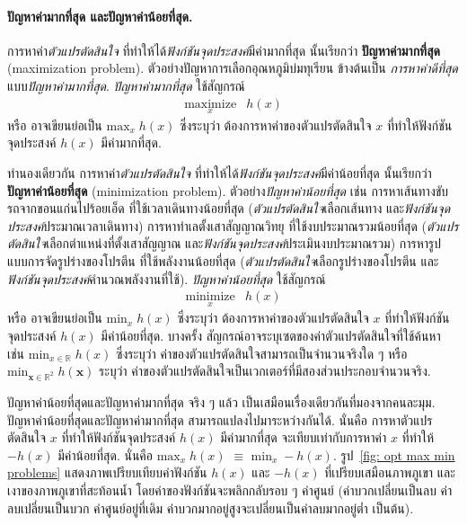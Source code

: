 \paragraph{ปัญหาค่ามากที่สุด และปัญหาค่าน้อยที่สุด.}
การหาค่า\textit{ตัวแปรตัดสินใจ} ที่ทำให้ได้\textit{ฟังก์ชันจุดประสงค์}มีค่ามากที่สุด นั้นเรียกว่า \textbf{ปัญหาค่ามากที่สุด} (maximization problem).
ตัวอย่างปัญหาการเลือกอุณหภูมิบ่มทุเรียน
ข้างต้นเป็น \textit{การหาค่าดีที่สุด}แบบ\textit{ปัญหาค่ามากที่สุด}.
\textit{ปัญหาค่ามากที่สุด} ใช้สัญกรณ์ \begin{eqnarray}
\underset{x}{\mathrm{maximize}} & h(x)
\label{eq: opt max prob}
\end{eqnarray}
หรือ อาจเขียนย่อเป็น $\mathrm{max}_x \; h(x)$
ซึ่งระบุว่า ต้องการหาค่าของตัวแปรตัดสินใจ $x$ ที่ทำให้ฟังก์ชันจุดประสงค์ $h(x)$ มีค่ามากที่สุด.

ทำนองเดียวกัน 
การหาค่า\textit{ตัวแปรตัดสินใจ} ที่ทำให้ได้\textit{ฟังก์ชันจุดประสงค์}มีค่าน้อยที่สุด นั้นเรียกว่า \textbf{ปัญหาค่าน้อยที่สุด} (minimization problem).
ตัวอย่าง\textit{ปัญหาค่าน้อยที่สุด}
เช่น 
การหาเส้นทางขับรถจากขอนแก่นไปร้อยเอ็ด ที่ใช้เวลาเดินทางน้อยที่สุด (\textit{ตัวแปรตัดสินใจ}เลือกเส้นทาง และ\textit{ฟังก์ชันจุดประสงค์}ประมาณเวลาเดินทาง)
การหาทำเลตั้งเสาสัญญาณวิทยุ ที่ใช้งบประมาณรวมน้อยที่สุด
(\textit{ตัวแปรตัดสินใจ}เลือกตำแหน่งที่ตั้งเสาสัญญาณ และ\textit{ฟังก์ชันจุดประสงค์}ประเมินงบประมาณรวม)
การหารูปแบบการจัดรูปร่างของโปรตีน ที่ใช้พลังงานน้อยที่สุด
(\textit{ตัวแปรตัดสินใจ}เลือกรูปร่างของโปรตีน และ\textit{ฟังก์ชันจุดประสงค์}คำนวณพลังงานที่ใช้).
\textit{ปัญหาค่าน้อยที่สุด} ใช้สัญกรณ์ \begin{eqnarray}
\underset{x}{\mathrm{minimize}} & h(x)
\label{eq: opt min prob}
\end{eqnarray}
หรือ อาจเขียนย่อเป็น $\mathrm{min}_x \; h(x)$
ซึ่งระบุว่า ต้องการหาค่าของตัวแปรตัดสินใจ $x$ ที่ทำให้ฟังก์ชันจุดประสงค์ $h(x)$ มีค่าน้อยที่สุด.
บางครั้ง สัญกรณ์อาจระบุเซตของค่าตัวแปรตัดสินใจที่ใช้ค้นหา เช่น $\mathrm{min}_{x \in \mathbb{R}} \; h(x)$
ซึ่งระบุว่า ค่าของตัวแปรตัดสินใจสามารถเป็นจำนวนจริงใด ๆ
หรือ
$\mathrm{min}_{\bm{x} \in \mathbb{R}^2} \; h(\bm{x})$
ระบุว่า ค่าของตัวแปรตัดสินใจเป็นเวกเตอร์ที่มีสองส่วนประกอบจำนวนจริง.

ปัญหาค่าน้อยที่สุดและปัญหาค่ามากที่สุด จริง ๆ แล้ว
เป็นเสมือนเรื่องเดียวกันที่มองจากคนละมุม.
ปัญหาค่าน้อยที่สุดและปัญหาค่ามากที่สุด
สามารถแปลงไปมาระหว่างกันได้.
นั่นคือ
การหาตัวแปรตัดสินใจ $x$ ที่ทำให้ฟังก์ชันจุดประสงค์ $h(x)$ มีค่ามากที่สุด 
จะเทียบเท่ากับการหาค่า $x$ ที่ทำให้ $-h(x)$ มีค่าน้อยที่สุด.
นั่นคือ $\mathrm{max}_x \; h(x)$
$\equiv$
$\mathrm{min}_x \; -h(x)$.
%
รูป~\ref{fig: opt max min problems} 
แสดงภาพเปรียบเทียบค่าฟังก์ชัน $h(x)$ และ $-h(x)$ ที่เปรียบเสมือนภาพภูเขา และเงาของภาพภูเขาที่สะท้อนน้ำ โดยค่าของฟังก์ชันจะพลิกกลับรอบ ๆ ค่าศูนย์ (ค่าบวกเปลี่ยนเป็นลบ ค่าลบเปลี่ยนเป็นบวก ค่าศูนย์อยู่ที่เดิม ค่าบวกมากอยู่สูงจะเปลี่ยนเป็นค่าลบมากอยู่ต่ำ เป็นต้น).

